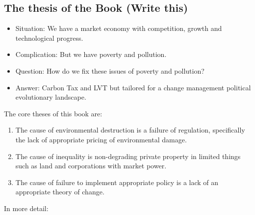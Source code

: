 \documentclass[]{tufte-handout}
\providecommand{\tightlist}{%
  \setlength{\itemsep}{0pt}\setlength{\parskip}{0pt}}
\begin{document}
\hypertarget{the-thesis-of-the-book-write-this}{%
\subsection{The thesis of the Book (Write
this)}\label{the-thesis-of-the-book-write-this}}

\begin{itemize}
\tightlist
\item
  Situation: We have a market economy with competition, growth and
  technological progress.
\item
  Complication: But we have poverty and pollution.
\item
  Question: How do we fix these issues of poverty and pollution?
\item
  Answer: Carbon Tax and LVT but tailored for a change management
  political evolutionary landscape.
\end{itemize}

The core theses of this book are:

\begin{enumerate}
\def\labelenumi{\arabic{enumi}.}
\tightlist
\item
  The cause of environmental destruction is a failure of regulation,
  specifically the lack of appropriate pricing of environmental damage.
\item
  The cause of inequality is non-degrading private property in limited
  things such as land and corporations with market power.
\item
  The cause of failure to implement appropriate policy is a lack of an
  appropriate theory of change.
\end{enumerate}

In more detail:
\end{document}
